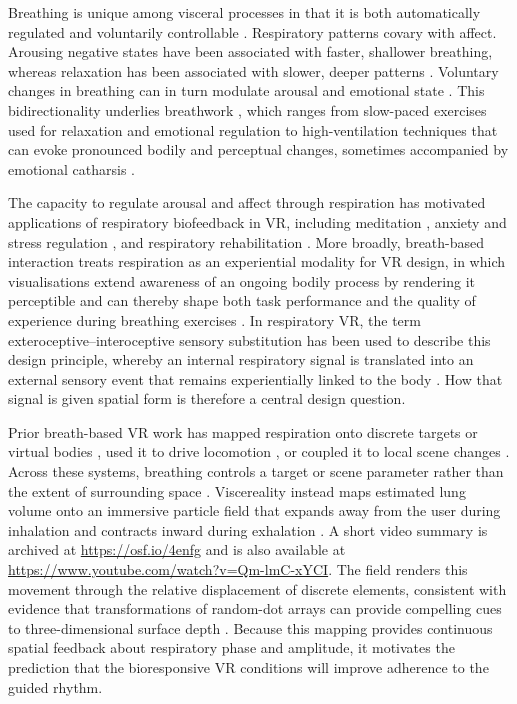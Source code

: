 \documentclass[pdflatex,sn-basic,lineno]{sn-jnl}
\begin{document}
Breathing is unique among visceral processes in that it is both automatically
regulated and voluntarily controllable \citep{corne2005basic, baertsch2025multimodal}.
Respiratory patterns covary with affect. Arousing negative states have been
associated with faster, shallower breathing, whereas relaxation has been
associated with slower, deeper patterns \citep{boiten1994emotions,
homma2008breathing, jerath2020respiratory}. Voluntary changes in breathing can
in turn modulate arousal and emotional state \citep{ashhad2022breathing,
jerath2020respiratory}. This bidirectionality underlies breathwork
\citep{fincham2023effect}, which ranges from slow-paced exercises used for
relaxation and emotional regulation \citep{zaccaro2018breath,
Bentley2023} to high-ventilation techniques that can evoke pronounced
bodily and perceptual changes, sometimes accompanied by emotional catharsis
\citep{bahi2024effects, havenith2025decreased, fincham2026airways,
schmitz2026high}.

The capacity to regulate arousal and affect through respiration has motivated
applications of respiratory biofeedback in VR, including meditation
\citep{Tinga2019}, anxiety and stress regulation \citep{Bossenbroek2020,
blum2019heart}, and respiratory rehabilitation \citep{Shi2023}. More broadly,
breath-based interaction treats respiration as an experiential modality for VR
design, in which visualisations extend awareness of an ongoing bodily process by
rendering it perceptible and can thereby shape both task performance and the
quality of experience during breathing exercises \citep{prpa2020inhaling}. In
respiratory VR, the term exteroceptive--interoceptive sensory substitution has
been used to describe this design principle, whereby an internal respiratory
signal is translated into an external sensory event that remains experientially
linked to the body \citep{GoralEtAl2024}. How that signal is given spatial form
is therefore a central design question.

Prior breath-based VR work has mapped respiration onto discrete targets or virtual bodies \citep{Tinga2019, MontiEtAl2020, Wald2023}, used it to drive locomotion \citep{Bossenbroek2020, rockstroh2021mobile}, or coupled it to local scene changes \citep{blum2020development}. Across these systems, breathing controls a target or scene parameter rather than the extent of surrounding space \citep{Tinga2019, MontiEtAl2020, Bossenbroek2020, rockstroh2021mobile, blum2020development, Wald2023}. Viscereality instead maps estimated lung volume onto an immersive particle field that expands away from the user during inhalation and contracts inward during exhalation \citep{fejer2025viscereality, fejer2026breathing}. A short video summary is archived at \url{https://osf.io/4enfg} and is also available at \url{https://www.youtube.com/watch?v=Qm-lmC-xYCI}. The field renders this movement through the relative displacement of discrete elements, consistent with evidence that transformations of random-dot arrays can provide compelling cues to three-dimensional surface depth \citep{Rogers1979}. Because this mapping provides continuous spatial feedback about respiratory phase and amplitude, it motivates the prediction that the bioresponsive VR conditions will improve adherence to the guided rhythm.
\end{document}
